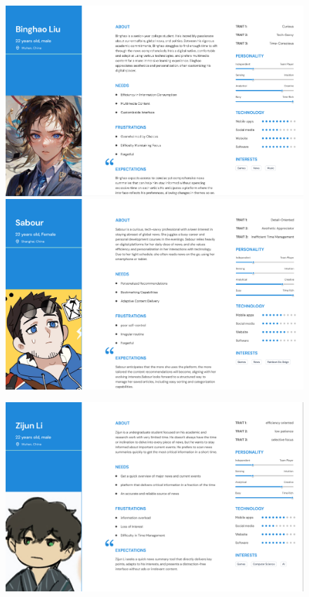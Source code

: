 \documentclass[a4paper]{article}
\begin{document}
\begin{figure}[H] %
	\centering %
	\includegraphics[width=1\textwidth]{./images/Persona_1.png} %
	\includegraphics[width=1\textwidth]{./images/Persona_2.png}
	\caption*{} %
	\label{Fig.Personas1} %
\end{figure}

\newpage

\begin{figure}[H] %
	\centering %
	\includegraphics[width=1\textwidth]{./images/Persona_3.png} %
	\caption*{} %
	\label{Fig.Persona2} %
\end{figure}
\end{document}
